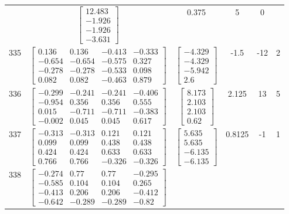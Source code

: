 \documentclass[a4paper,12pt]{article}
\begin{document}
\begin{tabular}{c c c c c c}
&
$\begin{bmatrix} 12.483 \\ -1.926 \\ -1.926 \\ -3.631 \end{bmatrix}$
&
0.375
&
5
&
0
\\
335
&
$\begin{bmatrix} 0.136 & 0.136 & -0.413 & -0.333 \\ -0.654 & -0.654 & -0.575 & 0.327 \\ -0.278 & -0.278 & -0.533 & 0.098 \\ 0.082 & 0.082 & -0.463 & 0.879 \end{bmatrix}$
&
$\begin{bmatrix} -4.329 \\ -4.329 \\ -5.942 \\ 2.6 \end{bmatrix}$
&
-1.5
&
-12
&
2
\\
336
&
$\begin{bmatrix} -0.299 & -0.241 & -0.241 & -0.406 \\ -0.954 & 0.356 & 0.356 & 0.555 \\ 0.015 & -0.711 & -0.711 & -0.383 \\ -0.002 & 0.045 & 0.045 & 0.617 \end{bmatrix}$
&
$\begin{bmatrix} 8.173 \\ 2.103 \\ 2.103 \\ 0.62 \end{bmatrix}$
&
2.125
&
13
&
5
\\
337
&
$\begin{bmatrix} -0.313 & -0.313 & 0.121 & 0.121 \\ 0.099 & 0.099 & 0.438 & 0.438 \\ 0.424 & 0.424 & 0.633 & 0.633 \\ 0.766 & 0.766 & -0.326 & -0.326 \end{bmatrix}$
&
$\begin{bmatrix} 5.635 \\ 5.635 \\ -6.135 \\ -6.135 \end{bmatrix}$
&
0.8125
&
-1
&
1
\\
338
&
$\begin{bmatrix} -0.274 & 0.77 & 0.77 & -0.295 \\ -0.585 & 0.104 & 0.104 & 0.265 \\ -0.413 & 0.206 & 0.206 & -0.412 \\ -0.642 & -0.289 & -0.289 & -0.82 \end{bmatrix}$

\end{tabular}
\end{document}
